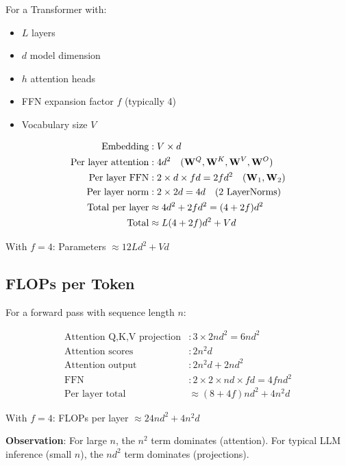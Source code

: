 For a Transformer with:
\begin{itemize}
    \item $L$ layers
    \item $d$ model dimension
    \item $h$ attention heads
    \item FFN expansion factor $f$ (typically 4)
    \item Vocabulary size $V$
\end{itemize}

\begin{align}
\text{Embedding} &: V \times d \\
\text{Per layer attention} &: 4d^2 \quad (\mathbf{W}^Q, \mathbf{W}^K, \mathbf{W}^V, \mathbf{W}^O) \\
\text{Per layer FFN} &: 2 \times d \times fd = 2fd^2 \quad (\mathbf{W}_1, \mathbf{W}_2) \\
\text{Per layer norm} &: 2 \times 2d = 4d \quad (\text{2 LayerNorms}) \\
\text{Total per layer} &\approx 4d^2 + 2fd^2 = (4 + 2f)d^2 \\
\text{Total} &\approx L(4 + 2f)d^2 + Vd
\end{align}

With $f=4$: Parameters $\approx 12Ld^2 + Vd$

\subsection{FLOPs per Token}

For a forward pass with sequence length $n$:

\begin{align}
\text{Attention Q,K,V projection} &: 3 \times 2nd^2 = 6nd^2 \\
\text{Attention scores} &: 2n^2d \\
\text{Attention output} &: 2n^2d + 2nd^2 \\
\text{FFN} &: 2 \times 2 \times nd \times fd = 4fnd^2 \\
\text{Per layer total} &\approx (8 + 4f)nd^2 + 4n^2d
\end{align}

With $f=4$: FLOPs per layer $\approx 24nd^2 + 4n^2d$

\textbf{Observation}: For large $n$, the $n^2$ term dominates (attention). For typical LLM inference (small $n$), the $nd^2$ term dominates (projections).

